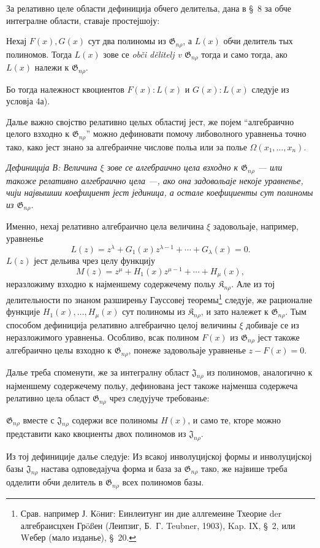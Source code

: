 ﻿\documentclass[11pt]{article}
\providecommand{\Kfield}{\mathfrak{K}}
\providecommand{\Jdom}{\mathfrak{J}}
\providecommand{\Gdom}{\mathfrak{G}}
\begin{document}
За релативно целе области дефиниција обчего делительа, дана в \S\ 8 за обче интегралне области, ставаје простејшоју:

Нехај $F(x),G(x)$ сут два полиномы из $\Gdom_{n\rho}$, а $L(x)$ обчи делитель тых полиномов. Тогда $L(x)$ зове се \emph{obči dělitelj v $\Gdom_{n\rho}$} тогда и само тогда, ако $L(x)$ належи к $\Gdom_{n\rho}$.

Бо тогда належност квоциентов $F(x):L(x)$ и $G(x):L(x)$ следује из условја 4а).

Далье важно својство релативно целых областиј јест, же појем ``алгебраично целого взходно к $\Gdom_{n\rho}$'' можно дефиновати помочу либоволного уравненьа точно тако, како јест знано за алгебраичне числове польа или за полье $\Omega(x_1,\ldots,x_n)$.

{\itshape Дефиниција В: Величина $\xi$ зове се алгебраично цела взходно к $\Gdom_{n\rho}$ --- или такоже релативно алгебраично цела ---, ако она задовольаје некоје уравненье, чији највышши коефициент јест јединица, а остале коефициенты сут полиномы из $\Gdom_{n\rho}$.}

Именно, нехај релативно алгебраично цела величина $\xi$ задовольаје, например, уравненье
\[
  L(z)=z^\lambda+G_1(x)z^{\lambda-1}+\cdots+G_\lambda(x)=0.
\]
$L(z)$ јест дельива чрез целу функцију
\[
  M(z)=z^\mu+H_1(x)z^{\mu-1}+\cdots+H_\mu(x),
\]
неразложиму взходно к најменшему содержечему польу $\Kfield_{n\rho}$. Але из тој делительности по знаном разширеньу Гауссовеј теоремы\footnote{Срав. например Ј. Кöниг: Еинлеитунг ин дие аллгемеине Тхеорие der алгебраисцхен Грößен (Леипзиг, Б.~Г. Teubner, 1903), Kap. IX, \S\ 2, или Wебер (мало изданье), \S\ 20.} следује, же рационалне функције $H_1(x),\ldots,H_\mu(x)$ сут полиномы из $\Kfield_{n\rho}$, и зато належет к $\Gdom_{n\rho}$. Тым способом дефиниција релативно алгебраично целој величины $\xi$ добиваје се из неразложимого уравненьа. Особливо, всак полином $F(x)$ из $\Gdom_{n\rho}$ јест такоже алгебраично целы взходно к $\Gdom_{n\rho}$, понеже задовольаје уравненье $z-F(x)=0$.

Далье треба споменути, же за интегралну област $\Jdom_{n\rho}$ из полиномов, аналогично к најменшему содержечему польу, дефинована јест такоже најменша содержеча релативно цела област $\Gdom_{n\rho}$ чрез следујуче требованье:

$\Gdom_{n\rho}$ вместе с $\Jdom_{n\rho}$ содержи все полиномы $H(x)$, и само те, кторе можно представити како квоциенты двох полиномов из $\Jdom_{n\rho}$.

Из тој дефиниције далье следује: Из всакој инволуцијској формы и инволуцијској базы $\Jdom_{n\rho}$ настава одповедајуча форма и база за $\Gdom_{n\rho}$ тако, же највише треба одделити обчи делитель в $\Gdom_{n\rho}$ всех полиномов базы.
\end{document}

